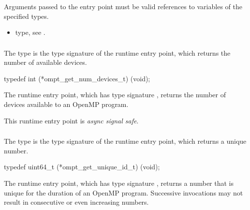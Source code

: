 \constraints
Arguments passed to the entry point must be valid references to variables 
of the specified types.

\crossreferences
\begin{itemize}
\item {} type, see .
\end{itemize}



\subsubsection{}
\label{sec:ompt_get_num_devices_t}
\label{sec:ompt_get_num_devices}

\summary
The  type is the type signature of the 
 runtime entry point, which returns the
number of available devices.

\format
\begin{ccppspecific}
\begin{omptInquiry}
typedef int (*ompt_get_num_devices_t) (void);
\end{omptInquiry}
\end{ccppspecific}

\descr
The  runtime entry point, which has 
type signature , returns the number 
of devices available to an OpenMP program.

This runtime entry point is \emph{async signal safe}.



\subsubsection{}
\label{sec:ompt_get_unique_id_t}
\label{sec:ompt_get_unique_id}

\summary
The  type is the type signature of the 
 runtime entry point, which returns a unique number.

\format
\begin{ccppspecific}
\begin{omptInquiry}
typedef uint64_t (*ompt_get_unique_id_t) (void);
\end{omptInquiry}
\end{ccppspecific}

\descr
The  runtime entry point, which has type 
signature , returns a number that is unique 
for the duration of an OpenMP program. Successive invocations may not 
result in consecutive or even increasing numbers.

